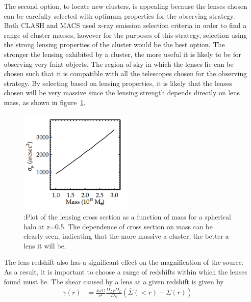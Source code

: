 	The second option, to locate new clusters, is appealing because the lenses chosen can be carefully selected with optimum properties for the observing strategy. Both CLASH and MACS used x-ray emission selection criteria in order to find a range of cluster masses, however for the purposes of this strategy, selection using the strong lensing properties of the cluster would be the best option. The stronger the lensing exhibited by a cluster, the more useful it is likely to be for observing very faint objects. The region of sky in which the lenses lie can be chosen such that it is compatible with all the telescopes chosen for the observing strategy. By selecting based on lensing properties, it is likely that the lenses chosen will be very massive since the lensing strength depends directly on lens mass, as shown in figure~\ref{fig:Lensing_cross_section_as_a_function_of_mass}\cite{Optimal_mass_configurations}.
	\begin{figure}[ht]
		\centering
			\includegraphics[width=0.5\textwidth]{../Images/Lensing_cross_section_as_a_function_of_mass.png}
		\caption[Lensing cross section as a function of mass]{\cite{Optimal_mass_configurations} :Plot of the lensing cross section as a function of mass for a spherical halo at z=0.5. The dependence of cross section on mass can be clearly seen, indicating that the more massive a cluster, the better a lens it will be.\label{fig:Lensing_cross_section_as_a_function_of_mass}}
	\end{figure}

	The lens redshift also has a significant effect on the magnification of the source. As a result, it is important to choose a range of redshifts within which the lenses found must lie. The shear caused by a lens at a given redshift is given by 
	\begin{align}
		\gamma(r) &= \frac{4\pi G}{c^2}\frac{D_{LS}D_{L}}{D_S}\left( \overbar{\Sigma}(<r)-\Sigma(r) \right)
	\end{align}

